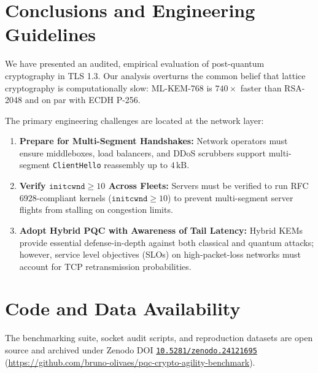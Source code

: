 \documentclass[10pt,twocolumn,a4paper]{article}
\begin{document}
\section{Conclusions and Engineering Guidelines}
We have presented an audited, empirical evaluation of post-quantum cryptography in TLS 1.3. Our analysis overturns the common belief that lattice cryptography is computationally slow: ML-KEM-768 is $740\times$ faster than RSA-2048 and on par with ECDH P-256. 

The primary engineering challenges are located at the network layer:
\begin{enumerate}
    \item \textbf{Prepare for Multi-Segment Handshakes:} Network operators must ensure middleboxes, load balancers, and DDoS scrubbers support multi-segment \texttt{ClientHello} reassembly up to $4\,\mathrm{kB}$.
    \item \textbf{Verify $\texttt{initcwnd} \ge 10$ Across Fleets:} Servers must be verified to run RFC 6928-compliant kernels ($\texttt{initcwnd} \ge 10$) to prevent multi-segment server flights from stalling on congestion limits.
    \item \textbf{Adopt Hybrid PQC with Awareness of Tail Latency:} Hybrid KEMs provide essential defense-in-depth against both classical and quantum attacks; however, service level objectives (SLOs) on high-packet-loss networks must account for TCP retransmission probabilities.
\end{enumerate}

\section*{Code and Data Availability}
The benchmarking suite, socket audit scripts, and reproduction datasets are open source and archived under Zenodo DOI \href{https://doi.org/10.5281/zenodo.24121695}{\texttt{10.5281/zenodo.24121695}} (\url{https://github.com/bruno-olivaes/pqc-crypto-agility-benchmark}).
\end{document}
